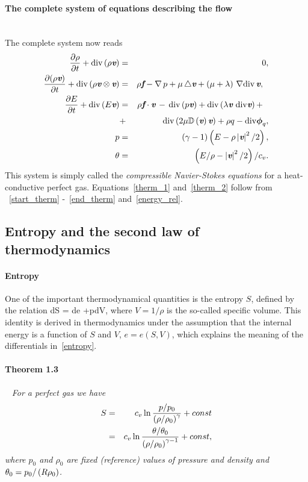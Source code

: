 \paragraph{The complete system of equations describing the flow}\ \\
The complete system now reads
\begin{eqnarray}
  \frac{\partial{\rho}}{\partial{t}} + \mathrm{div}\left(\rho\textit{\textbf{v}}\right) & = & 0,\\
\frac{\partial{\left(\rho\textit{\textbf{v}}\right)}}{\partial{t}} + \mathrm{div}\left(\rho\textit{\textbf{v}}\otimes\textit{\textbf{v}}\right)& = & \rho\textit{\textbf{f}} - \nabla\,p +
\mu\,\triangle{\textit{\textbf{v}}} + \left({}\mu+\lambda\right)\,\nabla\mathrm{div}\,\textit{\textbf{v}},\ \ \\
 \frac{\partial{E}}{\partial{t}} + \mathrm{div}\left({E}\textit{\textbf{v}}\right) & = & \rho\textit{\textbf{f}}\cdot\textit{\textbf{v}} \,-\,\mathrm{div}\left({p}\textit{\textbf{v}}\right) + \mathrm{div}\left({}\lambda\textit{\textbf{v}}\ \mathrm{div}\textit{\textbf{v}}\right) +\ \  \\ & + &\nonumber \mathrm{div}\left({2}\mu\mathbb{D}\left({}\textit{\textbf{v}}\right)\textit{\textbf{v}}\right) +
\rho{q}- \mathrm{div}\boldsymbol{\phi}_q,\\
p & = & \left({}\gamma-1\right)\left({E}-\rho\left|\textit{\textbf{v}}\right|^2/2\right), \label{therm_1}\\
\theta & = & \left({E}/{\rho}-\left|\textit{\textbf{v}}\right|^2/2\right)/{c_v}.\label{therm_2}
\end{eqnarray}
This system is simply called the \textit{compressible Navier-Stokes equations} for a heat-conductive perfect gas. Equations~\eqref{therm_1} and~\eqref{therm_2} follow from ~\eqref{start_therm} -~\eqref{end_therm} and~\eqref{energy_rel}.

\subsection{Entropy and the second law of thermodynamics}
\paragraph{Entropy}
One of the important thermodynamical quantities is the entropy $S$, defined by the relation
\be
\label{entropy}
\theta dS = de +pdV,
\ee
where $V=1/\rho$ is the so-called specific volume. This identity is derived in thermodynamics under the assumption that the internal energy is a function of $S$ and $V$, $e = e(S,V)$, which explains the meaning of the differentials in~\eqref{entropy}.
\paragraph{Theorem 1.3}
\ \newline
\itshape
For a perfect gas we have
\begin{eqnarray}
\label{entropy_relation}
S & = & c_v \ln\frac{p/p_0}{\left(\rho/\rho_0\right)^\gamma} + const \\
  & = & c_v \ln\frac{\theta/\theta_0}{\left(\rho/\rho_0\right)^{\gamma - 1}} + const,
\end{eqnarray}
\upshape
where $p_0$ and $\rho_0$ are fixed (reference) values of pressure and density and $\theta_0 = p_0/\left({R\rho_0}\right)$.
